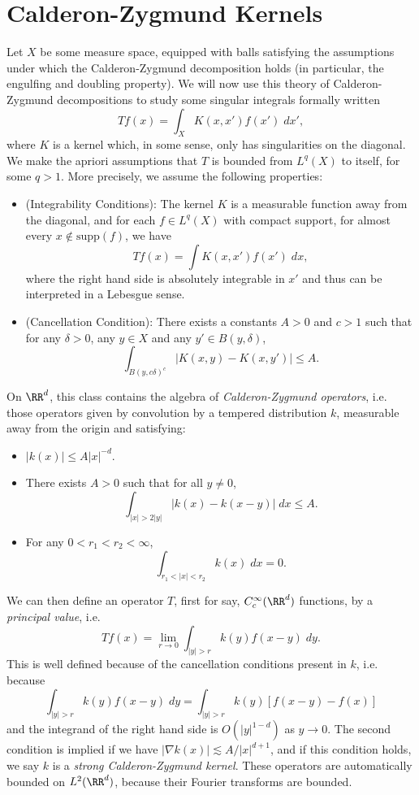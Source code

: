 \section{Calderon-Zygmund Kernels}

Let $X$ be some measure space, equipped with balls satisfying the assumptions under which the Calderon-Zygmund decomposition holds (in particular, the engulfing and doubling property). We will now use this theory of Calderon-Zygmund decompositions to study some singular integrals formally written
%
\[ Tf(x) = \int_X K(x,x') f(x')\; dx', \]
%
where $K$ is a kernel which, in some sense, only has singularities on the diagonal. We make the apriori assumptions that $T$ is bounded from $L^q(X)$ to itself, for some $q > 1$. More precisely, we assume the following properties:
%
\begin{itemize}
    \item (Integrability Conditions): The kernel $K$ is a measurable function away from the diagonal,  and for each $f \in L^q(X)$ with compact support, for almost every $x \not \in \text{supp}(f)$, we have
    \[ Tf(x) = \int K(x,x') f(x')\; dx, \]
    where the right hand side is absolutely integrable in $x'$ and thus can be interpreted in a Lebesgue sense.

    \item (Cancellation Condition): There exists a constants $A > 0$ and $c > 1$ such that for any $\delta > 0$, any $y \in X$ and any $y' \in B(y,\delta)$,
    \[ \int_{B(y,c \delta)^c} |K(x,y) - K(x,y')| \leq A. \]
\end{itemize}
%
On $\RR^d$, this class contains the algebra of \emph{Calderon-Zygmund operators}, i.e. those operators given by convolution by a tempered distribution $k$, measurable away from the origin and satisfying:
%
\begin{itemize}
    \item $|k(x)| \leq A |x|^{-d}$.
    \item There exists $A > 0$ such that for all $y \neq 0$,
    \[ \int_{|x| > 2 |y|} |k(x) - k(x-y)|\; dx \leq A. \]
    \item For any $0 < r_1 < r_2 < \infty$,
    \[ \int_{r_1 < |x| < r_2} k(x)\; dx = 0. \]
\end{itemize}
%
We can then define an operator $T$, first for say, $C_c^\infty(\RR^d)$ functions, by a \emph{principal value}, i.e.
%
\[ Tf(x) = \lim_{r \to 0} \int_{|y| > r} k(y) f(x-y)\; dy. \]
%
This is well defined because of the cancellation conditions present in $k$, i.e. because
%
\[ \int_{|y| > r} k(y) f(x-y)\; dy = \int_{|y| > r} k(y) [f(x-y) - f(x)] \]
%
and the integrand of the right hand side is $O(|y|^{1-d})$ as $y \to 0$. The second condition is implied if we have $|\nabla k(x)| \lesssim A/|x|^{d+1}$, and if this condition holds, we say $k$ is a \emph{strong Calderon-Zygmund kernel}. These operators are automatically bounded on $L^2(\RR^d)$, because their Fourier transforms are bounded.


